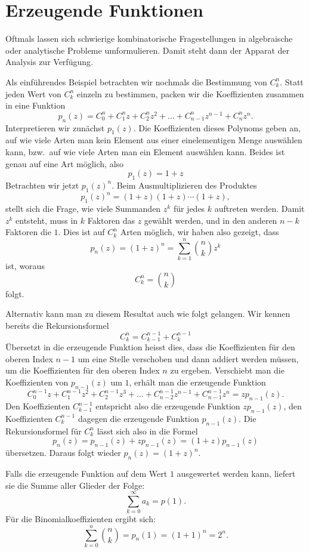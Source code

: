 \section{Erzeugende Funktionen}
Oftmals lassen sich schwierige kombinatorische Fragestellungen in
algebraische oder analytische Probleme umformulieren.
Damit steht
dann der Apparat der Analysis zur Verfügung.

Als einführendes
Beispiel betrachten wir nochmals die Bestimmung von $C^n_k$.
Statt jeden Wert von $C^n_k$ einzeln zu bestimmen, packen wir
die Koeffizienten zusammen in eine Funktion
\[
p_n(z)=C^n_0+C^n_1z +C^n_2z^2+\dots+C^n_{n-1}z^{n-1}+C^n_nz^n.
\]
Interpretieren wir zunächst $p_1(z)$.
Die Koeffizienten dieses
Polynoms geben an, auf wie viele Arten man kein Element aus einer
einelementigen Menge auswählen kann, bzw.~auf wie viele Arten man 
ein Element auswählen kann.
Beides ist genau auf eine Art möglich,
also
\[
p_1(z)=1+z
\]
Betrachten wir jetzt $p_1(z)^n$.
Beim Ausmultiplizieren des
Produktes 
\[
p_1(z)^n= (1+z)(1+z)\dotsm(1+z),
\]
stellt sich die Frage, wie viele Summanden $z^k$ für jedes
$k$ auftreten werden.
Damit $z^k$ entsteht, muss in $k$ Faktoren das $z$ gewählt werden,
und in den anderen $n-k$ Faktoren die $1$.
Dies ist auf $C^n_k$
Arten möglich, wir haben also gezeigt, dass
\[
p_n(z)=(1+z)^n=\sum_{k=1}^n \binom{n}{k}z^k
\]
ist, woraus
\[
C^n_k=\binom{n}{k}
\]
folgt.

Alternativ kann man zu diesem Resultat auch wie folgt gelangen.
Wir kennen bereits die Rekursionsformel
\[
C^n_k=C^{n-1}_{k-1}+C^{n-1}_k
\]
Übersetzt in die erzeugende Funktion heisst dies, dass die Koeffizienten
für den oberen Index $n-1$
um eine Stelle verschoben und dann addiert werden müssen,
um die Koeffizienten für den oberen Index $n$ zu ergeben.
Verschiebt
man die Koeffizienten von $p_{n-1}(z)$ um $1$,
erhält man die erzeugende Funktion
\[
C^{n-1}_0z
+C^{n-1}_1z^2
+C^{n-1}_2z^3
+\dots
+C^{n-1}_{n-2}z^{n-1}
+C^{n-1}_{n-1}z^n
=
zp_{n-1}(z).
\]
Den Koeffizienten $C^{n-1}_{k-1}$ entspricht also die
erzeugende Funktion $zp_{n-1}(z)$,
den Koeffizienten $C^{n-1}_k$ dagegen die erzeugende Funktion $p_{n-1}(z)$.
Die Rekursionsformel für $C^n_k$ lässt sich also in die Formel
\[
p_n(z)=p_{n-1}(z)+zp_{n-1}(z)=(1+z)p_{n-1}(z)
\]
übersetzen.
Daraus folgt wieder $p_n(z)=(1+z)^n$.

Falls die erzeugende Funktion auf dem Wert $1$ ausgewertet werden kann,
liefert sie die Summe aller Glieder der Folge:
\[
\sum_{k=0}^\infty a_k=p(1).
\]
Für die Binomialkoeffizienten ergibt sich:
\[
\sum_{k=0}^n\binom{n}{k}=p_n(1)=(1+1)^n=2^n.
\]

